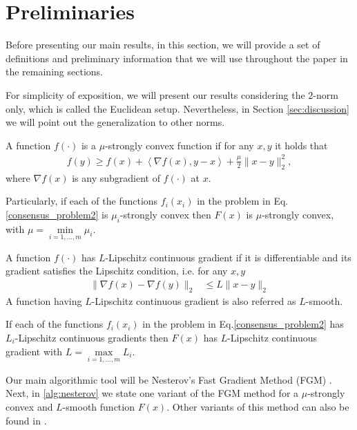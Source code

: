 \documentclass[final]{siamart1116}
\numberwithin{theorem}{section}
\begin{document}
	\section{Preliminaries}\label{sec:prelim}
	
	Before presenting our main results, in this section, we will provide a set of definitions and preliminary information that we will use throughout the paper in the remaining sections. 
	
		\begin{remark}
		For simplicity of exposition, we will present our results considering the $2$-norm only, which is called the Euclidean setup. Nevertheless, in Section \ref{sec:discussion} we will point out the generalization to other norms.
	\end{remark}
	
	\begin{definition}\label{def:strong}
		A function $f(\cdot)$ is a $\mu$-strongly convex function if for any $x,y$ it holds that
		\begin{align*}
		f(y) \geq f(x) + \left\langle \nabla f(x),y-x \right\rangle + \frac{\mu}{2}\|x-y\|^2_2,
		\end{align*}
		where $\nabla f(x)$ is any subgradient of $f(\cdot)$ at $x$. 
	\end{definition}
	
	Particularly, if each of the functions $f_i(x_i)$ in the problem in Eq.\eqref{consensus_problem2} is $\mu_i$-strongly convex then $F(x)$ is $\mu$-strongly convex, with $\mu = \min\limits_{i=1,\hdots,m} \mu_i$.
	
	\begin{definition}\label{def:smooth}
		A function $f( \cdot )$ has $L$-Lipschitz continuous gradient if it is differentiable and its gradient satisfies the Lipschitz condition, i.e. for any $x,y$
		\begin{align*}
		\|\nabla f(x) - \nabla f(y)\|_2 & \leq L \|x-y\|_2
		\end{align*}
		A function having $L$-Lipschitz continuous gradient is also referred as $L$-smooth. 
	\end{definition}
	
	If each of the functions $f_i(x_i)$ in the problem in Eq.\eqref{consensus_problem2} has $L_i$-Lipschitz continuous gradients then $F(x)$ has $L$-Lipschitz continuous gradient with $L = \max\limits_{i=1,\hdots,m} L_i$. 
	
	Our main algorithmic tool will be Nesterov's Fast Gradient Method (FGM) \cite{nes13}. Next, in \cref{alg:nesterov} we state one variant of the FGM method for a $\mu$-strongly convex and $L$-smooth function $F(x)$. Other variants of this method can also be found in \cite{nes13,bec09,lan11}.
	
\end{document}
